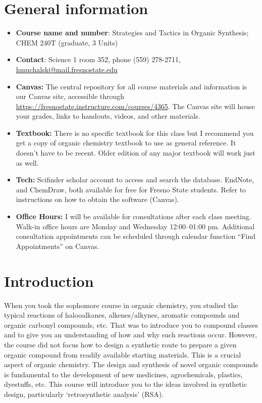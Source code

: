 \hypertarget{general-information}{%
\section{General information}\label{general-information}}

\begin{itemize}
\tightlist
\item
  \textbf{Course name and number}: Strategies and Tactics in Organic
  Synthesis; CHEM 240T (graduate, 3 Units)
\item
  \textbf{Contact}: Science 1 room 352, phone (559) 278-2711,
  \url{hmuchalski@mail.fresnostate.edu}
\item
  \textbf{Canvas:} The central repository for all course materials and
  information is our Canvas site, accessible through
  \url{https://fresnostate.instructure.com/courses/4365}. The Canvas
  site will house your grades, links to handouts, videos, and other
  materials.
\item
  \textbf{Textbook:} There is no specific textbook for this class but I
  recommend you get a copy of organic chemistry textbook to use as
  general reference. It doesn't have to be recent. Older edition of any
  major textbook will work just as well.
\item
  \textbf{Tech:} Scifinder scholar account to access and search the
  database. EndNote, and ChemDraw, both available for free for Fresno
  State students. Refer to instructions on how to obtain the software
  (Canvas).
\item
  \textbf{Office Hours:} I will be available for consultations after
  each class meeting. Walk-in office hours are Monday and Wednesday
  12:00--01:00 pm. Additional consultation appointments can be scheduled
  through calendar function ``Find Appointments'' on Canvas.
\end{itemize}

\hypertarget{introduction}{%
\section{Introduction}\label{introduction}}

When you took the sophomore course in organic chemistry, you studied the
typical reactions of halooalkanes, alkenes/alkynes, aromatic compounds
and organic carbonyl compounds, etc. That was to introduce you to
compound classes and to give you an understanding of how and why such
reactions occur. However, the course did not focus how to design a
synthetic route to prepare a given organic compound from readily
available starting materials. This is a crucial aspect of organic
chemistry. The design and synthesis of novel organic compounds is
fundamental to the development of new medicines, agrochemicals,
plastics, dyestuffs, etc. This course will introduce you to the ideas
involved in synthetic design, particularly `retrosynthetic analysis'
(RSA).

